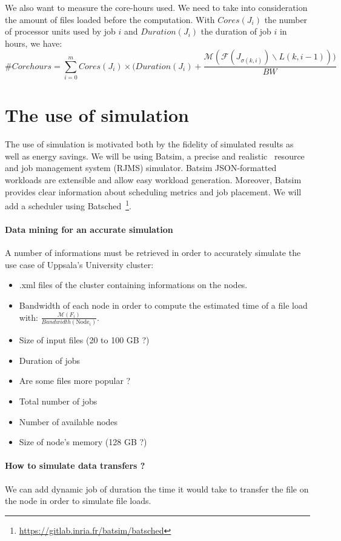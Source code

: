 \documentclass[a4paper]{article}
\newcommand{\Node}[1]{\ensuremath{\mathrm{Node}_{#1}}\xspace}
\newcommand{\inputs}{\ensuremath{\mathcal{F}}\xspace}
\newcommand{\memory}{\ensuremath{\mathcal{M}}\xspace}
\newcommand{\duration}{\mathit{Duration}\xspace}
\newcommand{\bandwidth}{\mathit{BW}\xspace}
\newcommand{\core}{\mathit{Cores}\xspace}
\newcommand{\live}{\ensuremath{L}\xspace}
\begin{document}
We also want to measure the core-hours used. We need to take into consideration the amount of files loaded before the computation.
With $\core(J_i)$ the number of processor units used by job $i$ and $\duration(J_i)$ the duration of job $i$ in hours, we have:
$$
	\#Corehours = \sum^{m}_{i = 0} \core(J_i) \times (\duration(J_i) + \frac{\memory(\inputs\left(J_{\sigma(k,i)}\right) \backslash \live(k,i-1)))}{\bandwidth}
$$

\section{The use of simulation}

The use of simulation is motivated both by the fidelity of simulated results as well as energy savings. 
We will be using Batsim, a precise and realistic~\cite{Batsim} resource and job management system (RJMS) simulator.
Batsim JSON-formatted workloads are extensible and allow easy workload generation. 
Moreover, Batsim provides clear information about scheduling metrics and job placement.
We will add a scheduler using Batsched~\footnote{\url{https://gitlab.inria.fr/batsim/batsched}}.

\paragraph{Data mining for an accurate simulation}
A number of informations must be retrieved in order to accurately 
simulate the use case of Uppsala's University cluster:
\begin{itemize}
	\item	.xml files of the cluster containing informations on the nodes.
	\item	Bandwidth of each node in order to compute the estimated time of a file load with: $\frac{\memory(F_i)}{\mathit{Bandwidth(\Node{i})}}$.
	\item	Size of input files (20 to 100 GB ?)
	\item	Duration of jobs
	\item	Are some files more popular ?
	\item	Total number of jobs
	\item	Number of available nodes
	\item	Size of node's memory (128 GB ?)
\end{itemize}

\paragraph{How to simulate data transfers ?}
We can add dynamic job of duration the time it would take to transfer the file on the node in order
to simulate file loads.
\end{document}
